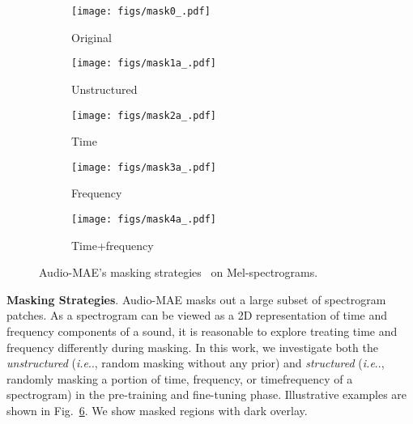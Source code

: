 \documentclass{article}
\makeatletter
\DeclareRobustCommand\onedot{\futurelet\@let@token\@onedot}
\def\@onedot{\ifx\@let@token.\else.\null\fi\xspace}
\def\ie{\emph{i.e}\onedot} \def\Ie{\emph{I.e}\onedot}
\makeatother
\begin{document}
\begin{figure}[t!h!]
\centering
    \begin{subfigure}[b]{0.19\linewidth}
        \texttt{[image: figs/mask0\_.pdf]}
        \caption{Original}
        \label{fig:masking:org}
    \end{subfigure}
    \begin{subfigure}[b]{0.19\linewidth}
        \texttt{[image: figs/mask1a\_.pdf]}
        \caption{Unstructured}
        \label{fig:masking:random}
    \end{subfigure}
    \begin{subfigure}[b]{0.19\linewidth}
        \texttt{[image: figs/mask2a\_.pdf]}
        \caption{Time}
        \label{fig:masking:time}
    \end{subfigure}
    \begin{subfigure}[b]{0.19\linewidth}
        \texttt{[image: figs/mask3a\_.pdf]}
        \caption{Frequency}
        \label{fig:masking:freq}
    \end{subfigure}
    \begin{subfigure}[b]{0.19\linewidth}
        \texttt{[image: figs/mask4a\_.pdf]}
        \caption{Time+frequency}
        \label{fig:masking:time_freq}
    \end{subfigure}
\caption{Audio-MAE's masking strategies~\label{fig:masking} on Mel-spectrograms.
    }
\end{figure}







\noindent \textbf{Masking Strategies}.
Audio-MAE masks out a large subset of spectrogram patches.
As a spectrogram can be viewed as a 2D representation of time and frequency components of a sound, it is reasonable to explore treating time and frequency differently during masking. 
In this work, we investigate both the \textit{unstructured} (\ie, random masking without any prior) and \textit{structured} (\ie, randomly masking a portion of time, frequency, or timefrequency of a spectrogram) in the pre-training and fine-tuning phase.
Illustrative examples are shown in Fig.~\ref{fig:masking}. We show masked regions with dark overlay. 
\end{document}
